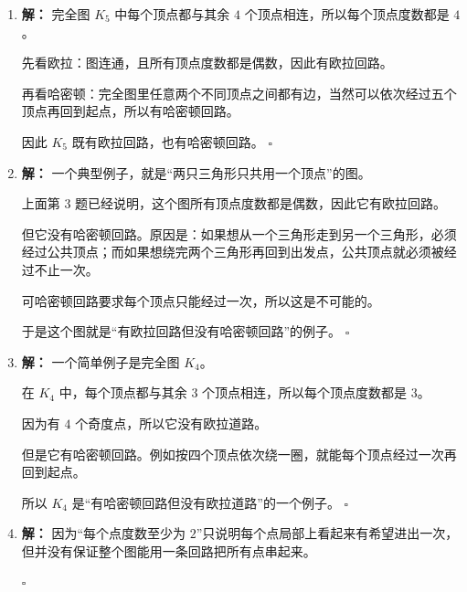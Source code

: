 \documentclass[11pt,a4paper,fontset=fandol]{ctexart}
\theoremstyle{formalexample}
\newenvironment{solution}{\par\noindent\textbf{解：}}{\hfill$\square$\par}
\begin{document}
\begin{enumerate}
\begin{solution}
  度数为 $1$ 的顶点不可能放在路径中间，因此 $A,B,C$ 这三个点都只能当路径端点。

  但是一条路径最多只有两个端点，不可能同时容纳三个度数为 $1$ 的顶点。

  矛盾，所以该图不可能有哈密顿路径。
  \end{solution}

  \item \begin{solution}
  完全图 $K_5$ 中每个顶点都与其余 $4$ 个顶点相连，所以每个顶点度数都是 $4$。

  先看欧拉：图连通，且所有顶点度数都是偶数，因此有欧拉回路。

  再看哈密顿：完全图里任意两个不同顶点之间都有边，当然可以依次经过五个顶点再回到起点，所以有哈密顿回路。

  因此 $K_5$ 既有欧拉回路，也有哈密顿回路。
  \end{solution}

  \item \begin{solution}
  一个典型例子，就是“两只三角形只共用一个顶点”的图。

  上面第 3 题已经说明，这个图所有顶点度数都是偶数，因此它有欧拉回路。

  但它没有哈密顿回路。原因是：如果想从一个三角形走到另一个三角形，必须经过公共顶点；而如果想绕完两个三角形再回到出发点，公共顶点就必须被经过不止一次。

  可哈密顿回路要求每个顶点只能经过一次，所以这是不可能的。

  于是这个图就是“有欧拉回路但没有哈密顿回路”的例子。
  \end{solution}

  \item \begin{solution}
  一个简单例子是完全图 $K_4$。

  在 $K_4$ 中，每个顶点都与其余 $3$ 个顶点相连，所以每个顶点度数都是 $3$。

  因为有 $4$ 个奇度点，所以它没有欧拉道路。

  但是它有哈密顿回路。例如按四个顶点依次绕一圈，就能每个顶点经过一次再回到起点。

  所以 $K_4$ 是“有哈密顿回路但没有欧拉道路”的一个例子。
  \end{solution}

  \item \begin{solution}
  因为“每个点度数至少为 $2$”只说明每个点局部上看起来有希望进出一次，但并没有保证整个图能用一条回路把所有点串起来。


\end{solution}
\end{enumerate}
\end{document}
